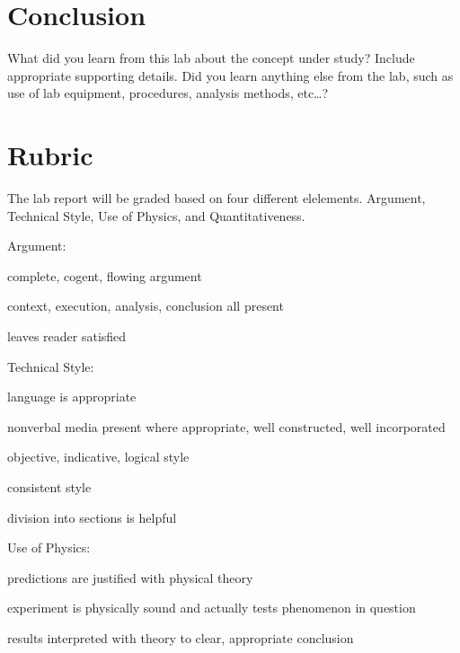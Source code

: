 \documentclass[
    10pt,aps,prl,
    amsfonts,
    amssymb,
    amsmath,
    runinaddress,
    secnum,
    showkeys,
    superscriptaddress,
    twocolumn,
]{revtex4}
\begin{document}
\section{Conclusion}
    \label{sec:conclusion}
    What did you learn from this lab about the concept under study? 
    Include appropriate supporting details. 
    Did you learn anything else from the lab, 
        such as use of lab equipment, procedures,
        analysis methods, etc\dots{}?


\appendix

\section{Rubric}
\label{sec:rubric}
    The lab report will be graded based on four different elelements.
    Argument, Technical Style, Use of Physics, and Quantitativeness.

    Argument:
    \begin{itemize*}
        \item complete, cogent, flowing argument
        \item context, execution, analysis, conclusion all present
        \item leaves reader satisfied
    \end{itemize*}

    Technical Style:
    \begin{itemize*}
        \item language is appropriate
        \item nonverbal media present where appropriate, well constructed, well incorporated
        \item objective, indicative, logical style
        \item consistent style
        \item division into sections is helpful
    \end{itemize*}

    Use of Physics:
    \begin{itemize*}
        \item predictions are justified with physical theory
        \item experiment is physically sound and actually tests phenomenon in question
        \item results interpreted with theory to clear, appropriate conclusion
    \end{itemize*}
\end{document}
